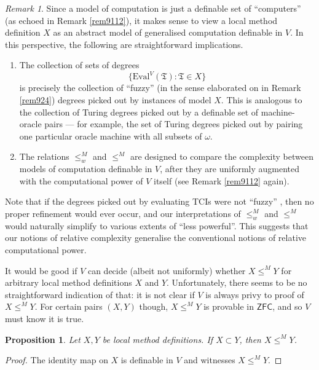 \documentclass[12pt, twoside]{memoir}
\numberwithin{equation}{section}
\newtheorem{prop}[thm]{Proposition}
\theoremstyle{definition}
\theoremstyle{remark}
\newtheorem{rem}[thm]{Remark}
\theoremstyle{definition}
\theoremstyle{definition}
\theoremstyle{definition}
\theoremstyle{remark}
\begin{document}
\begin{rem}
Since a model of computation is just a definable set of ``computers'' (as echoed in Remark \ref{rem9112}), it makes sense to view a local method definition $X$ as an abstract model of generalised computation definable in $V$. In this perspective, the following are straightforward implications.
\begin{enumerate}[label=(\arabic*)]
    \item The collection of sets of degrees
    \begin{equation*}
        \{\mathrm{Eval}^V(\mathfrak{T}) : \mathfrak{T} \in X\}
    \end{equation*}
    is precisely the collection of ``fuzzy'' (in the sense elaborated on in Remark \ref{rem924}) degrees picked out by instances of model $X$. This is analogous to the collection of Turing degrees picked out by a definable set of machine-oracle pairs --- for example, the set of Turing degrees picked out by pairing one particular oracle machine with all subsets of $\omega$.
    \item The relations $\leq^M_w$ and $\leq^M$ are designed to compare the complexity between models of computation definable in $V$, after they are uniformly augmented with the computational power of $V$ itself (see Remark \ref{rem9112} again).
\end{enumerate}  

Note that if the degrees picked out by evaluating TCIs were not ``fuzzy'' , then no proper refinement would ever occur, and our interpretations of $\leq^M_w$ and $\leq^M$ would naturally simplify to various extents of ``less powerful''. This suggests that our notions of relative complexity generalise the conventional notions of relative computational power.
\end{rem}

It would be good if $V$ can decide (albeit not uniformly) whether $X \leq^M Y$ for arbitrary local method definitions $X$ and $Y$. Unfortunately, there seems to be no straightforward indication of that: it is not clear if $V$ is always privy to proof of $X \leq^M Y$. For certain pairs $(X, Y)$ though, $X \leq^M Y$ is provable in $\mathsf{ZFC}$, and so $V$ must know it is true.

\begin{prop}\label{prop338}
Let $X, Y$ be local method definitions. If $X \subset Y$, then $X \leq^M Y$.
\end{prop}

\begin{proof}
The identity map on $X$ is definable in $V$ and witnesses $X \leq^M Y$.
\end{proof}
\end{document}

